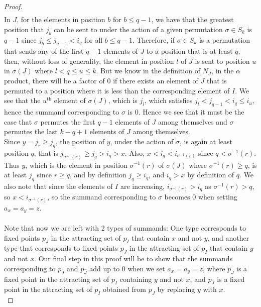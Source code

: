 \documentclass[10pt,a4paper]{amsart}
\begin{document}
\begin{proof}
\begin{align*}
\end{align*}
In $J$, for the elements in position $b$ for $b \leq q-1$, we have that the greatest position that $j_b$ can be sent to under the action of a given permutation $\sigma \in S_k$ is $q-1$ since $j_b \leq j_{q-1} < i_q$ for all $b \leq q-1$. Therefore, if $\sigma \in S_k$ is a permutation that sends any of the first $q-1$ elements of $J$ to a position that is at least $q$, then, without loss of generality, the element in position $l$ of $J$ is sent to position $u$ in $\sigma(J)$ where $l < q \leq u 
\leq k$. But we know in the definition of $N_J$, in the $\alpha$ product, there will be a factor of 0 if there exists an element of $J$ that is permuted to a position where it is less than the corresponding element of $I$. We see that the $u^{\text{th}}$ element of $\sigma(J)$, which is $j_l$, which satisfies $j_l < j_{q-1} < i_q \leq i_u$, hence the summand corresponding to $\sigma$ is 0. Hence we see that it must be the case that $\sigma$ permutes the first $q-1$ elements of $J$ among themselves and $\sigma$ permutes the last $k-q+1$ elements of $J$ among themselves.\\
Since $y = j_r \geq j_q$, the position of $y$, under the action of $\sigma$, is again at least position $q$, that is $j_{\sigma^{-1}(r)} \geq j_q > i_q > x$. Also, $x < i_q < i_{\sigma^{-1}(r)}$ since $q < \sigma^{-1}(r)$.\\
Thus $y$, which is the element in position $\sigma^{-1}(r)$ of $\sigma(J)$ where $\sigma^{-1}(r) \geq q$, is at least $j_q$ since $r \geq q$, and by definition $j_q \geq i_q$, and $i_q > x$ by definition of $q$. We also note that since the elements of $I$ are increasing, $i_{\sigma^{-1}(r)} > i_q$ as $\sigma^{-1}(r) > q$, so $x<i_{\sigma^{-1}(r)}$, so the summand corresponding to $\sigma$ becomes 0 when setting $a_x = a_y = z$.\\\\
Note that now we are left with 2 types of summands: One type corresponds to fixed points $p_{J}$ in the attracting set of $p_{I}$ that contain $x$ and not $y$, and another type that corresponds to fixed points $p_{J}$ in the attracting set of $p_{I}$ that contain $y$ and not $x$. Our final step in this proof will be to show that the summands corresponding to $p_{J}$ and $p_{\hat{J}}$ add up to 0 when we set $a_{x}=a_{y}=z$, where $p_{J}$ is a fixed point in the attracting set of $p_{I}$ containing $y$ and not $x$, and $p_{\hat{J}}$ is a fixed point in the attracting set of $p_{I}$ obtained from $p_{J}$ by replacing $y$ with $x$. \\


\end{proof}
\end{document}
